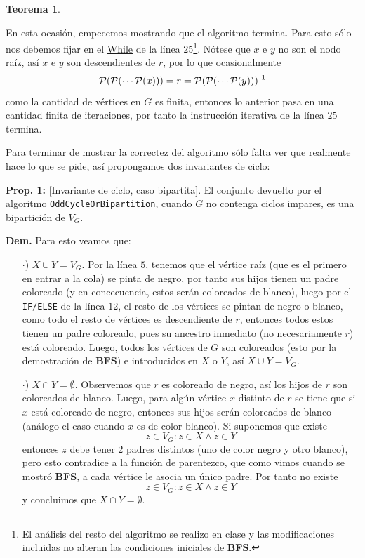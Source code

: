 \documentclass{article}
\newcommand{\code}[1]{\textcolor{white!25!black}{\texttt{#1}}}
\newtheorem*{theorem}{Teorema}
\begin{document}
\begin{enumerate}
\begin{center}
{\begin{minipage}[b][1\height]
\begin{theorem}
        \end{theorem}
    \end{minipage}}
  \end{center}
  En esta ocasi\'on, empecemos mostrando que el algoritmo termina.
  Para esto s\'olo nos debemos fijar en el \underline{While} de  la
  l\'inea $25$\footnote{El an\'alisis del resto del algoritmo se
    realizo en clase y las modificaciones incluidas no alteran las
    condiciones iniciales de \textbf{BFS}.}. N\'otese que $x$ e $y$
  no son el nodo  ra\'iz, as\'i $x$ e $y$ son descendientes de $r$,
  por lo que ocasionalmente
  \[
  \mathcal{P}(\mathcal{P}(\dotsm\mathcal{P}
  (x))) = r = \mathcal{P}(\mathcal{P}(\dotsm\mathcal{P}(y)))\text{
    \footnote{En otro caso, $x$ e $y$ tienen un ancestro comu\'un
      distinto de $r$ y se cumple la misma condici\'on.}}
  \]
  como la cantidad de v\'ertices
  en $G$ es finita, entonces lo anterior pasa en una cantidad finita
  de iteraciones, por tanto la instrucci\'on iterativa de la l\'inea
  $25$ termina.
    
  Para terminar de mostrar la correctez del algoritmo sólo falta ver que
  realmente hace lo que se pide, as\'i propongamos dos invariantes de ciclo:
  
  \textbf{Prop. 1:} [Invariante de ciclo, caso bipartita]. El conjunto
  devuelto por el algoritmo \code{OddCycleOrBipartition}, cuando $G$
  no contenga ciclos impares, es una bipartici\'on de $V_G$.  
  
  \textbf{Dem.}   Para esto veamos que:
  \begin{itemize}
  \item[$\cdot$)] $X\cup Y = V_G$. Por la l\'inea $5$, tenemos que el
    v\'ertice ra\'iz (que es el primero en entrar a la cola) se pinta
    de negro, por tanto sus hijos tienen un padre coloreado (y en concecuencia,
    estos ser\'an coloreados de blanco), luego por el \code{IF/ELSE}
    de la l\'inea $12$, el resto de los v\'ertices se pintan de negro
    o blanco, como todo el resto de v\'ertices es descendiente de $r$,
    entonces todos estos tienen un padre coloreado, pues su ancestro
    inmediato (no necesariamente $r$) est\'a coloreado. Luego, todos
    los v\'ertices de $G$ son coloreados (esto por la demostraci\'on de
    \textbf{BFS}) e introducidos en $X$ o $Y$, as\'i $X\cup Y = V_G$.
    
  \item[$\cdot$)] $X\cap Y = \emptyset$. Observemos que $r$ es coloreado
    de negro, as\'i los hijos de $r$ son coloreados de blanco. Luego,
    para alg\'un v\'ertice $x$ distinto de $r$ se tiene que si $x$ est\'a
    coloreado de negro, entonces sus hijos ser\'an coloreados de blanco
    (an\'alogo el caso cuando $x$ es de color blanco). Si suponemos que
    existe
    \[
    z \in V_G : z \in X \land z \in Y
    \]
    entonces $z$ debe tener $2$ padres distintos (uno de color negro y
    otro blanco), pero esto contradice a la funci\'on de parentezco,
    que como vimos cuando se mostr\'o \textbf{BFS}, a cada v\'ertice
    le asocia un \'unico padre. Por tanto no existe
    \[
    z \in V_G : z \in X \land z \in Y
    \]
    y concluimos que $X\cap Y = \emptyset$.
    

\end{itemize}
\end{enumerate}
\end{document}
